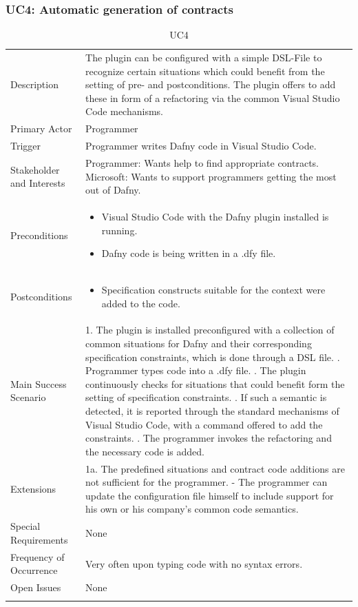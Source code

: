 \subsubsection{UC4: Automatic generation of contracts}\label{autogen}
\begin{longtable}{l | p{} }
	Description & The plugin can be configured with a simple DSL-File to recognize certain situations which could benefit from the setting of pre- and postconditions. The plugin offers to add these in form of a refactoring via the common Visual Studio Code mechanisms.\\ 
	Primary Actor & Programmer\\ 
	Trigger & Programmer writes Dafny code in Visual Studio Code.\\ 
	Stakeholder and Interests & Programmer: Wants help to find appropriate contracts. \newline Microsoft: Wants to support programmers getting the most out of Dafny.\\ 
	Preconditions &
	\begin{itemize}
		\item Visual Studio Code with the Dafny plugin installed is running.
		\item Dafny code is being written in a .dfy file.
	\end{itemize}\\ 
	Postconditions &
	\begin{itemize}
		\item Specification constructs suitable for the context were added to the code.
	\end{itemize}\\ 
	Main Success Scenario & 
	1. The plugin is installed preconfigured with a collection of common situations for Dafny and their corresponding specification constraints, which is done through a DSL file. \newline
	2. Programmer types code into a .dfy file. \newline 
	3. The plugin continuously checks for situations that could benefit form the setting of specification constraints. \newline 
	4. If such a semantic is detected, it is reported through the standard mechanisms of Visual Studio Code, with a command offered to add the constraints. \newline
	5. The programmer invokes the refactoring and the necessary code is added.\\ 
	Extensions & 
	1a. The predefined situations and contract code additions are not sufficient for the programmer. \newline 
	- The programmer can update the configuration file himself to include support for his own or his company's  common code semantics. \\ 
	Special Requirements & None\\ 
	Frequency of Occurrence & Very often upon typing code with no syntax errors.\\ 
	Open Issues & None \\ 
	\caption{UC4}
\end{longtable}

